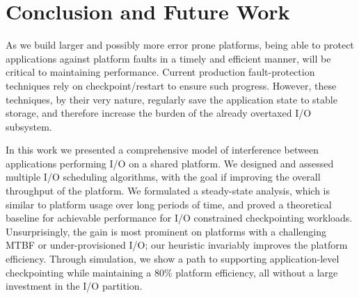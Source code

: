 \section{Conclusion and Future Work} \label{sec:conclusion}

As we build larger and possibly more error prone platforms, being able to
protect applications against platform faults in a timely and efficient manner,
will be critical to maintaining performance. Current production
fault-protection techniques rely on checkpoint/restart to ensure such progress.
However, these techniques, by their very nature, regularly save the application state
to stable storage, and therefore increase the burden of the already overtaxed
I/O subsystem.

In this work we presented a comprehensive model of interference between
applications performing I/O on a shared platform. We designed and assessed
multiple I/O scheduling algorithms, with the goal if improving the overall
throughput of the platform. We formulated a steady-state analysis, which is
similar to platform usage over long periods of time, and proved a theoretical
baseline for achievable performance for I/O constrained checkpointing
workloads.  Unsurprisingly, the gain is most prominent on platforms with a
challenging MTBF or under-provisioned I/O; our heuristic invariably improves
the platform efficiency. Through simulation, we show a path to supporting
application-level checkpointing while maintaining a 80\% platform efficiency,
all without a large investment in the I/O partition.


